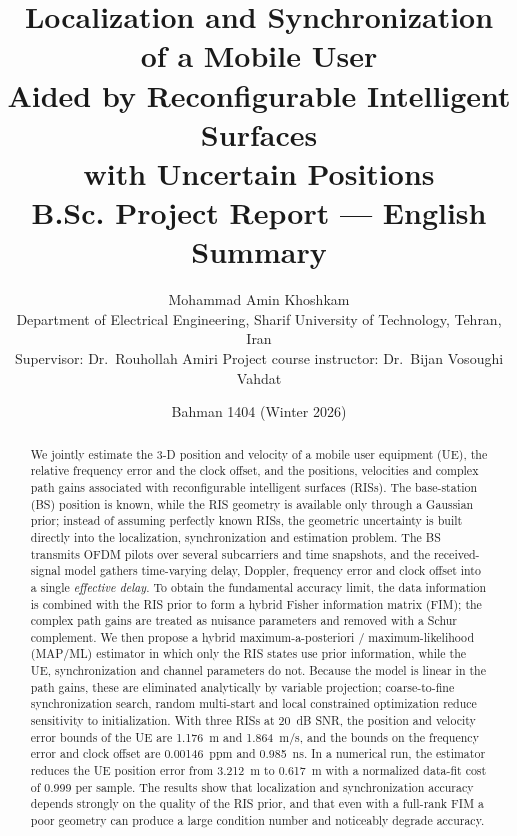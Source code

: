 \documentclass[11pt,a4paper]{article}
\title{\textbf{Localization and Synchronization of a Mobile User\\
Aided by Reconfigurable Intelligent Surfaces\\ with Uncertain Positions}\\[0.6em]
\large B.Sc. Project Report --- English Summary}
\author{Mohammad Amin Khoshkam\\[0.3em]
\small Department of Electrical Engineering, Sharif University of Technology, Tehran, Iran\\[0.6em]
\small Supervisor: Dr.\ Rouhollah Amiri \qquad Project course instructor: Dr.\ Bijan Vosoughi Vahdat}
\date{\small Bahman 1404 (Winter 2026)}
\begin{document}
\maketitle

\begin{center}
\end{center}

\begin{abstract}
We jointly estimate the 3-D position and velocity of a mobile user equipment (UE), the relative frequency
error and the clock offset, and the positions, velocities and complex path gains associated with
reconfigurable intelligent surfaces (RISs). The base-station (BS) position is known, while the RIS geometry is
available only through a Gaussian prior; instead of assuming perfectly known RISs, the geometric uncertainty is
built directly into the localization, synchronization and estimation problem. The BS transmits OFDM pilots over
several subcarriers and time snapshots, and the received-signal model gathers time-varying delay, Doppler,
frequency error and clock offset into a single \emph{effective delay}. To obtain the fundamental accuracy limit,
the data information is combined with the RIS prior to form a hybrid Fisher information matrix (FIM); the
complex path gains are treated as nuisance parameters and removed with a Schur complement. We then propose a
hybrid maximum-a-posteriori / maximum-likelihood (MAP/ML) estimator in which only the RIS states use prior
information, while the UE, synchronization and channel parameters do not. Because the model is linear in the
path gains, these are eliminated analytically by variable projection; coarse-to-fine synchronization search,
random multi-start and local constrained optimization reduce sensitivity to initialization. With three RISs at
20~dB SNR, the position and velocity error bounds of the UE are 1.176~m and 1.864~m/s, and the bounds on the
frequency error and clock offset are 0.00146~ppm and 0.985~ns. In a numerical run, the estimator reduces the UE
position error from 3.212~m to 0.617~m with a normalized data-fit cost of 0.999 per sample. The results show that
localization and synchronization accuracy depends strongly on the quality of the RIS prior, and that even with a
full-rank FIM a poor geometry can produce a large condition number and noticeably degrade accuracy.
\end{abstract}
\end{document}
